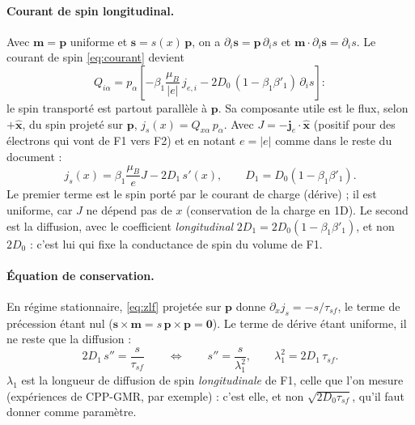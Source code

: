 \documentclass[11pt,a4paper]{article}
\newcommand{\vm}{\bm{m}}
\newcommand{\vp}{\bm{p}}
\newcommand{\vs}{\bm{s}}
\begin{document}
\paragraph{Courant de spin longitudinal.} Avec $\vm=\vp$ uniforme et
$\vs = s(x)\,\vp$, on a $\partial_i\vs = \vp\,\partial_i s$ et
$\vm\cdot\partial_i\vs = \partial_i s$. Le courant de spin
\eqref{eq:courant} devient
\begin{equation}
  Q_{i\alpha} = p_\alpha\left[-\beta_1\frac{\mu_B}{|e|}\,j_{e,i}
    - 2D_0\,(1-\beta_1\beta'_1)\,\partial_i s\right] :
\end{equation}
le spin transporté est partout parallèle à $\vp$. Sa composante utile est
le flux, selon $+\hat{\bm{x}}$, du spin projeté sur $\vp$,
$j_s(x) = Q_{x\alpha}\,p_\alpha$. Avec $J = -\bm{j}_e\cdot\hat{\bm{x}}$
(positif pour des électrons qui vont de F1 vers F2) et en notant $e=|e|$
comme dans le reste du document :
\begin{equation}
  j_s(x) = \beta_1\frac{\mu_B}{e}J - 2D_1\,s'(x),
  \qquad D_1 = D_0(1-\beta_1\beta'_1).
  \label{eq:F1-1D}
\end{equation}
Le premier terme est le spin porté par le courant de charge (dérive) ; il
est uniforme, car $J$ ne dépend pas de $x$ (conservation de la charge en
1D). Le second est la diffusion, avec le coefficient \emph{longitudinal}
$2D_1 = 2D_0(1-\beta_1\beta'_1)$, et non $2D_0$ : c'est lui qui fixe la
conductance de spin du volume de F1.

\paragraph{Équation de conservation.} En régime stationnaire,
\eqref{eq:zlf} projetée sur $\vp$ donne
$\partial_x j_s = -s/\tau_{sf}$, le terme de précession étant nul
($\vs\times\vm = s\,\vp\times\vp = \bm{0}$). Le terme de dérive étant
uniforme, il ne reste que la diffusion :
\begin{equation}
  2D_1\,s'' = \frac{s}{\tau_{sf}}
  \qquad\Longleftrightarrow\qquad
  s'' = \frac{s}{\lambda_1^2},
  \qquad \lambda_1^2 = 2D_1\,\tau_{sf}.
\end{equation}
$\lambda_1$ est la longueur de diffusion de spin \emph{longitudinale} de F1,
celle que l'on mesure (expériences de CPP-GMR, par exemple) : c'est elle,
et non $\sqrt{2D_0\tau_{sf}}$, qu'il faut donner comme paramètre.
\end{document}

